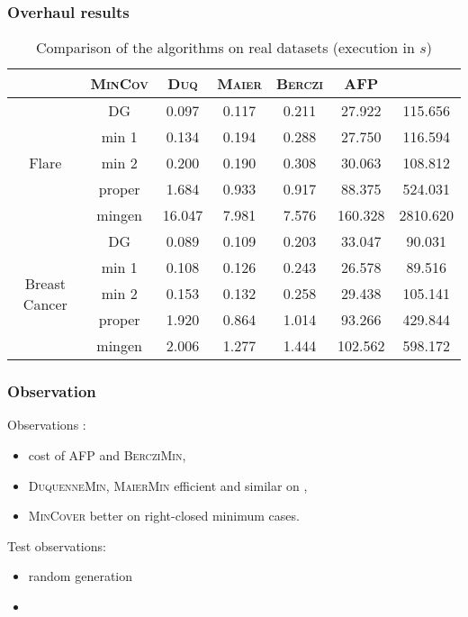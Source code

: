 \begin{frame}[fragile]
\frametitle{Overhaul results}

{\small
\begin{table}[H]
	\centering
	\begin{tabular}{| c | c || c | c | c | c | c |}
		\hline \rowcolor{clouds}
		\multicolumn{2}{c}{$\I$} & \textsc{MinCov} & \textsc{Duq} & \textsc{Maier} & \textsc{Berczi} & \textsc{AFP} \\ \hline
		
		\multirow{5}{*}{Flare}
		& DG           & 0.097 & 0.117 & 0.211 & 27.922 & 115.656 \\
		& min 1 & 0.134 & 0.194 & 0.288 & 27.750 & 116.594 \\
		& min 2 & 0.200 & 0.190 & 0.308 & 30.063 & 108.812 \\
		& proper       & 1.684 & 0.933 & 0.917 & 88.375 & 524.031 \\
		& mingen       & 16.047 & 7.981 & 7.576 & 160.328 & 2810.620 \\ \hline
		
		\multirow{5}{*}{Breast Cancer}
		& DG           & 0.089 & 0.109 & 0.203 & 33.047 & 90.031 \\
		& min 1 & 0.108 & 0.126 & 0.243 & 26.578 & 89.516 \\
		& min 2 & 0.153 & 0.132 & 0.258 & 29.438 & 105.141 \\
		& proper       & 1.920 & 0.864 & 1.014 & 93.266 & 429.844 \\
		& mingen       & 2.006 & 1.277 & 1.444 & 102.562 & 598.172 \\ \hline
		
	\end{tabular} 
	\caption{Comparison of the algorithms on real datasets (execution in $s$)}
	\label{tab:real-exe}
\end{table}
}

\end{frame}

\begin{frame}
\frametitle{Observation}

Observations :
\begin{itemize}
	\item cost of \textsc{AFP} and \textsc{BercziMin},
	\item \textsc{DuquenneMin}, \textsc{MaierMin} efficient and similar on ,
	\item \textsc{MinCover} better on right-closed minimum cases.
\end{itemize}

\vspace{1.2em}

Test observations:
\begin{itemize}
	\item random generation
	\item 
\end{itemize}

\end{frame}

